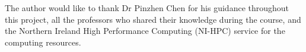\par\medskip
\noindent The author would like to thank Dr Pinzhen Chen for his guidance throughout this project, all the professors who shared their knowledge during the course, and the Northern Ireland High Performance Computing (NI-HPC) service for the computing resources.
